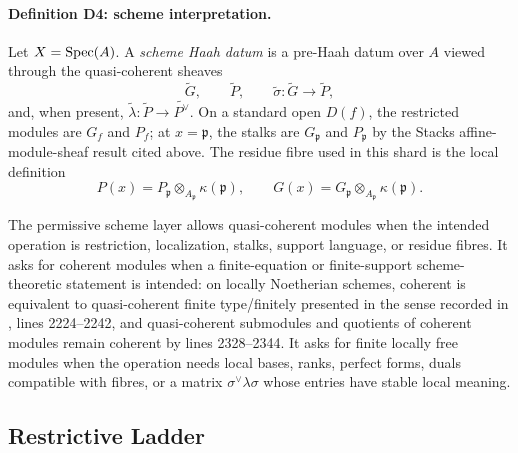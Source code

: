 \paragraph{Definition D4: scheme interpretation.}
Let \(X=\operatorname{Spec}(A)\).  A \emph{scheme Haah datum} is a pre-Haah datum over \(A\)
viewed through the quasi-coherent sheaves
\[
  \widetilde G,\qquad \widetilde P,\qquad
  \widetilde\sigma:\widetilde G\to\widetilde P,
\]
and, when present, \(\widetilde\lambda:\widetilde P\to\widetilde{P^\vee}\).
On a standard open \(D(f)\), the restricted modules are \(G_f\) and \(P_f\);
at \(x=\mathfrak p\), the stalks are \(G_{\mathfrak p}\) and
\(P_{\mathfrak p}\) by the Stacks affine-module-sheaf result cited above.
The residue fibre used in this shard is the local definition
\[
  P(x)=P_{\mathfrak p}\otimes_{A_{\mathfrak p}}\kappa(\mathfrak p),
  \qquad
  G(x)=G_{\mathfrak p}\otimes_{A_{\mathfrak p}}\kappa(\mathfrak p).
\]

The permissive scheme layer allows quasi-coherent modules when the intended
operation is restriction, localization, stalks, support language, or residue
fibres.  It asks for coherent modules when a finite-equation or finite-support
scheme-theoretic statement is intended: on locally Noetherian schemes,
coherent is equivalent to quasi-coherent finite type/finitely presented in the
sense recorded in
, lines
2224--2242, and quasi-coherent submodules and quotients of coherent modules
remain coherent by lines 2328--2344.  It asks for finite locally free modules
when the operation needs local bases, ranks, perfect forms, duals compatible
with fibres, or a matrix \(\sigma^\vee\lambda\sigma\) whose entries have stable
local meaning.

\subsection{Restrictive Ladder}


